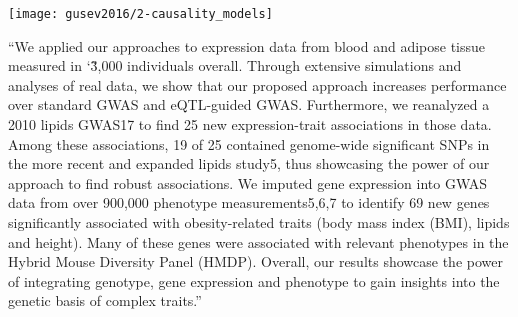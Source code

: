 \documentclass[../main.tex]{subfiles}
\begin{document}
\begin{marginfigure}[-2cm]
	\texttt{[image: gusev2016/2-causality\_models]}
	\caption{}
\end{marginfigure}

\enquote{We applied our approaches to expression data from blood and 
adipose tissue measured in \char`\~3,000 individuals overall. Through 
extensive simulations and analyses of real data, we show that our 
proposed approach increases performance over standard GWAS and 
eQTL-guided GWAS. Furthermore, we reanalyzed a 2010 lipids GWAS17 to 
find 25 new expression-trait associations in those data. Among these 
associations, 19 of 25 contained genome-wide significant SNPs in the 
more recent and expanded lipids study5, thus showcasing the power of our 
approach to find robust associations. We imputed gene expression into 
GWAS data from over 900,000 phenotype measurements5,6,7 to identify 69 
new genes significantly associated with obesity-related traits (body 
mass index (BMI), lipids and height). Many of these genes were 
associated with relevant phenotypes in the Hybrid Mouse Diversity Panel 
(HMDP). Overall, our results showcase the power of integrating genotype, 
gene expression and phenotype to gain insights into the genetic basis of 
complex traits.}
\end{document}
